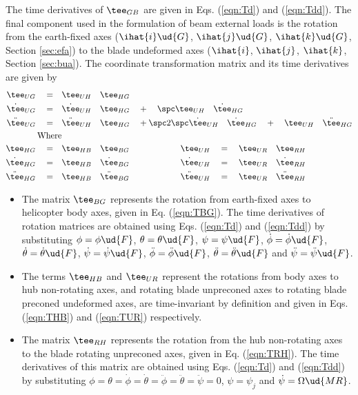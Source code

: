 The time derivatives of $\tee_{GB}$ are given in Eqs. (\ref{eqn:Td}) and (\ref{eqn:Tdd}). The final component used in the formulation of beam external loads is the rotation  from the earth-fixed axes ($\ihat{i}\ud{G}$, $\ihat{j}\ud{G}$, $\ihat{k}\ud{G}$, Section \ref{sec:efa}) to the blade undeformed axes ($\ihat{i}$, $\ihat{j}$, $\ihat{k}$, Section \ref{sec:bua}). The coordinate transformation matrix and its time derivatives are given by
\begin{align}
\label{eqn:TUG}
\tee_{UG} \quad = \quad & \tee_{UH}\quad \tee_{HG} \\
\dot{\tee}_{UG} \quad = \quad & \dot{\tee}_{UH} \quad \tee_{HG} \quad + \quad \spc \tee_{UH} \quad \dot{\tee}_{HG} \notag \\ 
\ddot{\tee}_{UG} \quad = \quad & \ddot{\tee}_{UH} \quad \tee_{HG} \quad + \spc 2 \spc  \dot{\tee}_{UH} \quad \dot{\tee}_{HG} \quad + \quad \tee_{UH} \quad \ddot{\tee}_{HG} \notag \\
\textrm{Where} \notag \\
\tee_{HG} \quad = \quad & \tee_{HB} \quad \tee_{BG} \qquad \qquad \qquad \tee_{UH} \quad = \quad \tee_{UR} \quad \tee_{RH} \notag \\
\dot{\tee}_{HG} \quad = \quad & \tee_{HB} \quad \dot{\tee}_{BG} \qquad \qquad \qquad \dot{\tee}_{UH} \quad = \quad \tee_{UR} \quad \dot{\tee}_{RH} \notag \\
\ddot{\tee}_{HG} \quad = \quad & \tee_{HB} \quad \ddot{\tee}_{BG} \qquad \qquad \qquad \ddot{\tee}_{UH} \quad = \quad \tee_{UR} \quad \ddot{\tee}_{RH} \notag
\end{align}
\begin{itemize}
\item The matrix $\tee_{BG}$ represents the rotation from earth-fixed axes to helicopter body axes, given in Eq. (\ref{eqn:TBG}). The time derivatives of rotation matrices are obtained using Eqs. (\ref{eqn:Td}) and (\ref{eqn:Tdd}) by substituting $\phi=\phi\ud{F}$, $\theta=\theta\ud{F}$, $\psi=\psi\ud{F}$, $\dot{\phi}=\dot{\phi}\ud{F}$, $\dot{\theta}=\dot{\theta}\ud{F}$, $\dot{\psi}=\dot{\psi}\ud{F}$, $\ddot{\phi}=\ddot{\phi}\ud{F}$, $\ddot{\theta}=\ddot{\theta}\ud{F}$ and $\ddot{\psi}=\ddot{\psi}\ud{F}$. 
\item The terms $\tee_{HB}$ and $\tee_{UR}$ represent the rotations from body axes to hub non-rotating axes, and rotating blade unpreconed axes to rotating blade preconed undeformed axes, are time-invariant by definition and given in Eqs. (\ref{eqn:THB}) and (\ref{eqn:TUR}) respectively. 
\item The matrix $\tee_{RH}$ represents the rotation from the hub non-rotating axes to the blade rotating unpreconed axes, given in Eq. (\ref{eqn:TRH}). The time derivatives of this matrix are obtained using Eqs. (\ref{eqn:Td}) and (\ref{eqn:Tdd}) by substituting $\phi=\theta=\dot{\phi}=\dot{\theta}=\ddot{\phi}=\ddot{\theta}=\ddot{\psi}=0$, $\psi=\psi_j$ and $\dot{\psi}=\Omega\ud{MR}$.
\end{itemize}

